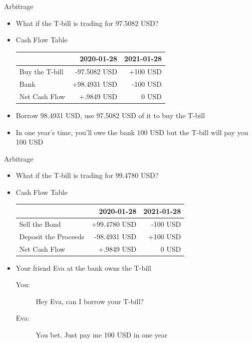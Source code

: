 \documentclass{beamer}
\begin{document}
\begin{frame}{Arbitrage}
\begin{itemize}
\item What if the T-bill is trading for 97.5082 USD? 
\item Cash Flow Table
\begin{table}
\begin{center}
\begin{tabular}{lrr}
	& \textbf{2020-01-28} & \textbf{2021-01-28} \\ \hline
	Buy the T-bill & -97.5082 USD & +100 USD \\
	Bank & +98.4931 USD & -100 USD\\ \hline
	Net Cash Flow & +.9849 USD & 0 USD 
\end{tabular}
\end{center}
\end{table}
\item Borrow 98.4931 USD, use 97.5082 USD of it to buy the T-bill
\item In one year's time, you'll owe the bank 100 USD but the T-bill will pay you 100 USD
\end{itemize}
\end{frame}
\begin{frame}{Arbitrage}
\begin{itemize}
\item What if the T-bill is trading for 99.4780 USD?
\item Cash Flow Table
\begin{table}
\begin{center}
\begin{tabular}{lrr}
& \textbf{2020-01-28} & \textbf{2021-01-28} \\ \hline
Sell the Bond & +99.4780 USD & -100 USD \\
Deposit the Proceeds & -98.4931 USD & +100 USD \\ \hline
Net Cash Flow & +.9849 USD & 0 USD
\end{tabular}
\end{center}
\end{table}
\item Your friend Eva at the bank owns the T-bill 
\begin{description}
\item[You:] Hey Eva, can I borrow your T-bill? 
\item[Eva:] You bet. Just pay me 100 USD in one year
\end{description}
\end{itemize}
\end{frame}
\end{document}
